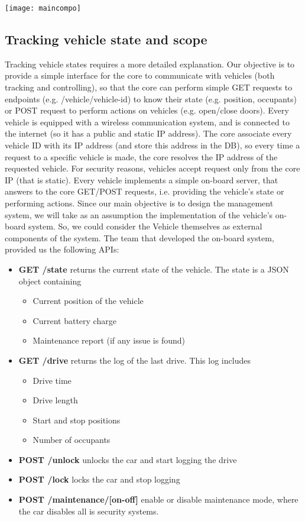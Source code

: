 \texttt{[image: maincompo]}
\newpage
\subsection{Tracking vehicle state and scope}
Tracking vehicle states requires a more detailed explanation. Our objective is to provide a simple interface for the core to communicate with vehicles (both tracking and controlling), so that the core can perform simple GET requests to endpoints (e.g. /vehicle/vehicle-id) to know their state (e.g. position, occupants) or POST request to perform actions on vehicles (e.g. open/close doors). Every vehicle is equipped with a wireless communication system, and is connected to the internet (so it has a public and static IP address). The core associate every vehicle ID with its IP address (and store this address in the DB), so every time a request to a specific vehicle is made, the core resolves the IP address of the requested vehicle. For security reasons, vehicles accept request only from the core IP (that is static). Every vehicle implements a simple on-board server, that answers to the core GET/POST requests, i.e. providing the vehicle's state or performing actions.
Since our main objective is to design the management system, we will take as an assumption the implementation of the vehicle's on-board system. So, we could consider the Vehicle themselves as external components of the system. The team that developed the on-board system, provided us the following APIs:
\begin{itemize}
	\item \textbf{GET /state} returns the current state of the vehicle. The state is a JSON object containing \begin{itemize}
		\item Current position of the vehicle
		\item Current battery charge
		\item Maintenance report (if any issue is found)
		\end{itemize} 
	\item \textbf{GET /drive} returns the log of the last drive. This log includes \begin{itemize}
		\item Drive time
		\item Drive length
		\item Start and stop positions
		\item Number of occupants
		\end{itemize}
	\item \textbf{POST /unlock} unlocks the car and start logging the drive
	\item \textbf{POST /lock} locks the car and stop logging
	\item \textbf{POST /maintenance/[on-off]} enable or disable maintenance mode, where the car disables all is security systems. 
\end{itemize}
\newpage
